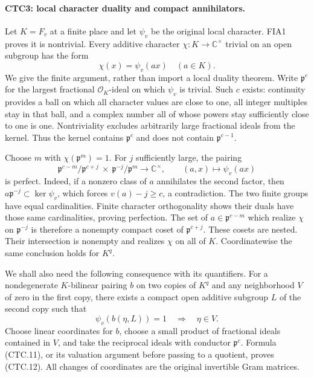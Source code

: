 \paragraph{CTC3: local character duality and compact annihilators.}
\label{claim:CTC3}
Let $K=F_v$ at a finite place and let $\psi_v$ be the original local
character.  FIA1 proves it is nontrivial.  Every additive character
$\chi:K\to\mathbb C^\times$ trivial on an open subgroup has the form
\[
                         \chi(x)=\psi_v(ax)\quad(a\in K).
 \tag{CTC.10}
\]
We give the finite argument, rather than import a local duality
theorem.  Write $\mathfrak p^c$ for the largest fractional
$\mathcal O_K$-ideal on which $\psi_v$ is trivial.  Such $c$ exists:
continuity provides a ball on which all character values are close
to one, all integer multiples stay in that ball, and a complex
number all of whose powers stay sufficiently close to one is one.
Nontriviality excludes arbitrarily large fractional ideals from
the kernel.  Thus the kernel contains $\mathfrak p^c$ and does not
contain $\mathfrak p^{c-1}$.

Choose $m$ with $\chi(\mathfrak p^m)=1$.  For $j$ sufficiently large,
the pairing
\[
 \mathfrak p^{c-m}/\mathfrak p^{c+j}\ \times\
 \mathfrak p^{-j}/\mathfrak p^m\longrightarrow\mathbb C^\times,
                   \qquad(a,x)\longmapsto\psi_v(ax)
 \tag{CTC.11}
\]
is perfect.  Indeed, if a nonzero class of $a$ annihilates the
second factor, then $a\mathfrak p^{-j}\subset\ker\psi_v$, which
forces $v(a)-j\ge c$, a contradiction.  The two finite groups
have equal cardinalities.  Finite character orthogonality shows
their duals have those same cardinalities, proving perfection.
The set of $a\in\mathfrak p^{c-m}$ which realize $\chi$ on
$\mathfrak p^{-j}$ is therefore a nonempty compact coset of
$\mathfrak p^{c+j}$.  These cosets are nested.  Their intersection
is nonempty and realizes $\chi$ on all of $K$.  Coordinatewise the
same conclusion holds for $K^q$.

We shall also need the following consequence with its quantifiers.
For a nondegenerate $K$-bilinear pairing $b$ on two copies of $K^q$
and any neighborhood $V$ of zero in the first copy, there exists a
compact open additive subgroup $L$ of the second copy such that
\[
 \psi_v(b(\eta,L))=1\quad\Longrightarrow\quad\eta\in V.
 \tag{CTC.12}
\]
Choose linear coordinates for $b$, choose a small product of
fractional ideals contained in $V$, and take the reciprocal ideals
with conductor $\mathfrak p^c$.  Formula (CTC.11), or its valuation
argument before passing to a quotient, proves (CTC.12).  All changes
of coordinates are the original invertible Gram matrices.

